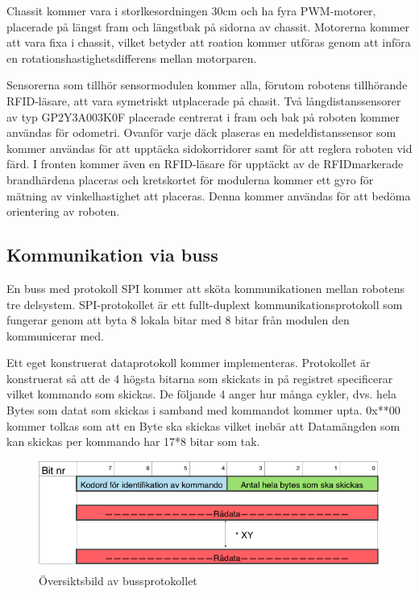 \documentclass[a4paper,12pt,fleqn]{article}
\begin{document}
Chassit kommer vara i storlkesordningen 30cm och ha fyra PWM-motorer, placerade på längst fram och längstbak på sidorna av chassit. Motorerna kommer att vara fixa i chassit, vilket betyder att roation kommer utföras genom att införa en rotationshastighetsdifferens mellan motorparen.

Sensorerna som tillhör sensormodulen kommer alla, förutom robotens tillhörande RFID-läsare, att vara symetriskt utplacerade på chasit. Två långdistanssensorer av typ GP2Y3A003K0F placerade centrerat i fram och bak på roboten kommer användas för odometri. Ovanför varje däck plaseras en medeldistanssensor som kommer användas för att upptäcka sidokorridorer samt för att reglera roboten vid färd.
I fronten kommer även en RFID-läsare för upptäckt av de RFIDmarkerade brandhärdena placeras och kretskortet för modulerna kommer ett gyro för mätning av vinkelhastighet att placeras. Denna kommer användas för att bedöma orientering av roboten.

\subsection{Kommunikation via buss}
En buss med protokoll SPI kommer att sköta kommunikationen mellan robotens tre delsystem. SPI-protokollet är ett fullt-duplext kommunikationsprotokoll som fungerar genom att byta 8 lokala bitar med 8 bitar från modulen den kommunicerar med. 

Ett eget konstruerat dataprotokoll kommer implementeras. Protokollet är konstruerat så att de 4 högsta bitarna som skickats in på registret specificerar vilket kommando som skickas.
De följande 4 anger hur många cykler, dvs. hela Bytes som datat som skickas i samband med kommandot kommer upta. 0x**00 kommer tolkas som att en Byte ska skickas vilket inebär att Datamängden som kan skickas per kommando har 17*8 bitar som tak.

\begin{figure}[htp] %
  \begin{center}
  \includegraphics[keepaspectratio=true,width=\linewidth]{bussprotokoll}  %
  \end{center}
  \caption{Översiktsbild av bussprotokollet} %
  \label{fig:case1flow}
\end{figure}
\end{document}
